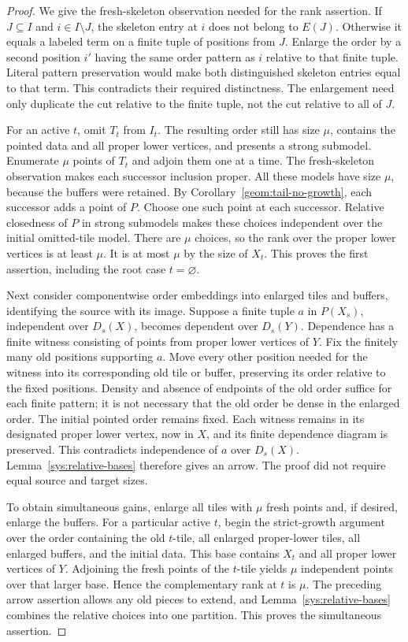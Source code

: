 \begin{proof}
We give the fresh-skeleton observation needed for the rank assertion.
If $J\subseteq I$ and $i\in I\setminus J$, the skeleton entry at $i$
does not belong to $E(J)$.  Otherwise it equals a labeled term on a
finite tuple of positions from $J$.  Enlarge the order by a second
position $i'$ having the same order pattern as $i$ relative to that
finite tuple.  Literal pattern preservation would make both
distinguished skeleton entries equal to that term.  This contradicts
their required distinctness.  The enlargement need only duplicate
the cut relative to the finite tuple, not the cut relative to all of
$J$.

For an active $t$, omit $T_t$ from $I_t$.  The resulting order still
has size $\mu$, contains the pointed data and all proper lower
vertices, and presents a strong submodel.  Enumerate $\mu$ points of
$T_t$ and adjoin them one at a time.  The fresh-skeleton observation
makes each successor inclusion proper.  All these models have size
$\mu$, because the buffers were retained.  By
Corollary~\ref{geom:tail-no-growth}, each successor adds a point of
$P$.  Choose one such point at each successor.  Relative closedness
of $P$ in strong submodels makes these choices independent over the
initial omitted-tile model.  There are $\mu$ choices, so the rank over
the proper lower vertices is at least $\mu$.  It is at most $\mu$
by the size of $X_t$.  This proves the first assertion, including the
root case $t=\varnothing$.

Next consider componentwise order embeddings into enlarged tiles and
buffers, identifying the source with its image.  Suppose a finite
tuple $a$ in $P(X_s)$, independent over $D_s(X)$, becomes dependent
over $D_s(Y)$.  Dependence has a finite witness consisting of points
from proper lower vertices of $Y$.  Fix the finitely many old
positions supporting $a$.  Move every other position needed for the
witness into its corresponding old tile or buffer, preserving its
order relative to the fixed positions.  Density and absence of
endpoints of the old order suffice for each finite pattern; it is
not necessary that the old order be dense in the enlarged order.
The initial pointed order remains fixed.  Each witness remains in
its designated proper lower vertex, now in $X$, and its finite
dependence diagram is preserved.  This contradicts independence of
$a$ over $D_s(X)$.  Lemma~\ref{sys:relative-bases} therefore gives an
arrow.  The proof did not require equal source and target sizes.

To obtain simultaneous gains, enlarge all tiles with $\mu$ fresh
points and, if desired, enlarge the buffers.  For a particular active
$t$, begin the strict-growth argument over the order containing the
old $t$-tile, all enlarged proper-lower tiles, all enlarged buffers,
and the initial data.  This base contains $X_t$ and all proper lower
vertices of $Y$.  Adjoining the fresh points of the $t$-tile yields
$\mu$ independent points over that larger base.  Hence the
complementary rank at $t$ is $\mu$.  The preceding arrow assertion
allows any old pieces to extend, and
Lemma~\ref{sys:relative-bases} combines the relative choices into
one partition.  This proves the simultaneous assertion.


\end{proof}
